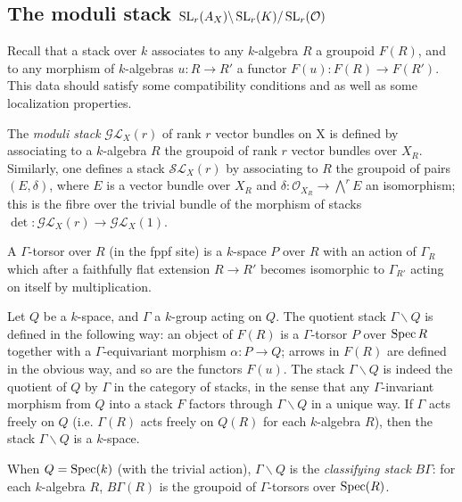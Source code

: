 \documentclass[12pt]{article}
\begin{document}
\subsection{The moduli stack $\operatorname{SL}_r(A_X) \backslash \operatorname{SL}_r(K) / \operatorname{SL}_r(\mathcal{O})$}

Recall that a stack over $k$ associates to any $k$-algebra $R$ a groupoid $F(R)$, and to any morphism of $k$-algebras $u : R \to R'$ a functor $F(u) : F(R) \to F(R')$. This data should satisfy some compatibility conditions and as well as some localization properties.
\begin{example}
    The \textit{moduli stack} $\mathcal{G}\mathcal{L}_X(r)$ of rank $r$ vector bundles on X is defined by associating to a $k$-algebra $R$ the groupoid of rank $r$ vector bundles over $X_R$. Similarly, one defines a stack $\mathcal{S}\mathcal{L}_X(r)$ by associating to $R$ the groupoid of pairs $(E,\delta)$, where $E$ is a vector bundle over $X_R$ and $\delta : \mathcal{O}_{X_R} \to \bigwedge^r E$ an isomorphism; this is the fibre over the trivial bundle of the morphism of stacks $\det : \mathcal{G}\mathcal{L}_X(r) \to \mathcal{G}\mathcal{L}_X(1)$.
\end{example}

\begin{definition}
    A $\Gamma$-torsor over $R$ (in the fppf site) is a $k$-space $P$ over $R$ with an action of $\Gamma_R$ which after a faithfully flat extension $R\to R'$ becomes isomorphic to $\Gamma_{R'}$ acting on itself by multiplication.
\end{definition}

\begin{example}
    Let $Q$ be a $k$-space, and $\Gamma$ a $k$-group acting on $Q$. The quotient stack $\Gamma\backslash Q$ is defined in the following way: an object of $F(R)$ is a $\Gamma$-torsor $P$ over $\operatorname{Spec} R$ together with a $\Gamma$-equivariant morphism $\alpha : P \to Q$; arrows in $F(R)$ are defined in the obvious way, and so are the functors $F(u)$. The stack $\Gamma\backslash Q$ is indeed the quotient of $Q$ by $\Gamma$ in the category of stacks, in the sense that any $\Gamma$-invariant morphism from $Q$ into a stack $F$ factors through $\Gamma\backslash Q$ in a unique way. If $\Gamma$ acts freely on $Q$ (i.e. $\Gamma(R)$ acts freely on $Q(R)$ for each $k$-algebra $R$), then the stack $\Gamma\backslash Q$ is a $k$-space.
\end{example}

When $Q = \operatorname{Spec}(k)$ (with the trivial action), $\Gamma\backslash Q$ is the \textit{classifying stack} $B\Gamma$: for each $k$-algebra $R$, $B\Gamma(R)$ is the groupoid of $\Gamma$-torsors over $\operatorname{Spec}(R)$.
\end{document}

